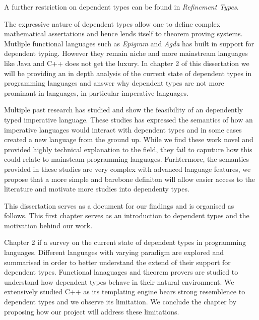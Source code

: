 \documentclass[a4paper,12pt]{report}
\begin{document}
\par
A further restriction on dependent types can be found in \textit{Refinement 
Types}.

\par
The expressive nature of dependent types allow one to define complex 
mathematical assertations and hence lends itself to theorem proving systems. 
Mutliple functional languages such as \textit{Epigram} 
\cite{epigram} and \textit{Agda} \cite{agda} has 
built in support for dependent typing. However they remain niche and more 
mainstream languages like Java and C++ does not get the luxury. In chapter 2 of 
this dissertation we will be providing an in depth analysis of the current state 
of dependent types in programming languages and answer why dependent types are 
not more prominant in languages, in particular imperative languages.

\par
Multiple past research has studied and show the feasibility of an dependently typed 
imperative language. These studies has expressed the semantics of 
how an imperative languages would interact with dependent types and in some 
cases created a new language from the ground up. While we find these work novel 
and provided highly technical explanation to the field, they fail to caputure 
how this could relate to mainsteam programming languages. Furhtermore, the 
semantics provided in these studies are very complex with advanced language 
features, we propose that a more simple and barebone definiton will allow easier 
access to the literature and motivate more studies into dependenty types. 

\par
This dissertation serves as a document for our findings and is organised as 
follows. This first chapter serves as an introduction to dependent types and the 
motivation behind our work.

\par
Chapter 2 if a survey on the current state of dependent types 
in programming languages. Different languages with varying paradigm are explored 
and summarised in order to better understand the extend of their support 
for dependent types. Functional lanaguages and theorem provers are studied to 
understand how dependent types behave in their natural environment. We 
extensively studied C++ as its templating engine bears strong resemblence to 
dependent types and we observe its limitation. 
We conclude the chapter by proposing how our project will address these limitations. 
\end{document}
